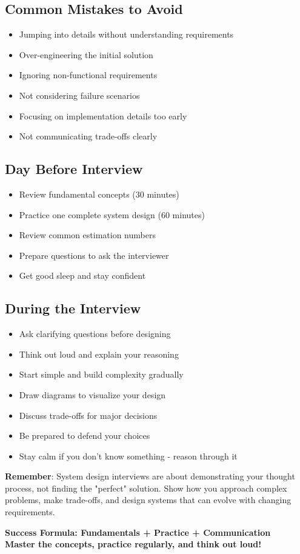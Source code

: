 \documentclass[10pt,a4paper]{article}
\begin{document}
\subsection{Common Mistakes to Avoid}
\begin{itemize}
\item Jumping into details without understanding requirements
\item Over-engineering the initial solution
\item Ignoring non-functional requirements
\item Not considering failure scenarios
\item Focusing on implementation details too early
\item Not communicating trade-offs clearly
\end{itemize}

\subsection{Day Before Interview}
\begin{itemize}
\item Review fundamental concepts (30 minutes)
\item Practice one complete system design (60 minutes)
\item Review common estimation numbers
\item Prepare questions to ask the interviewer
\item Get good sleep and stay confident
\end{itemize}

\subsection{During the Interview}
\begin{itemize}
\item Ask clarifying questions before designing
\item Think out loud and explain your reasoning
\item Start simple and build complexity gradually
\item Draw diagrams to visualize your design
\item Discuss trade-offs for major decisions
\item Be prepared to defend your choices
\item Stay calm if you don't know something - reason through it
\end{itemize}

\begin{tradeoffbox}
\textbf{Remember}: System design interviews are about demonstrating your thought process, not finding the "perfect" solution. Show how you approach complex problems, make trade-offs, and design systems that can evolve with changing requirements.
\end{tradeoffbox}

\vspace{1cm}
\begin{center}
\textbf{\Large Success Formula: Fundamentals + Practice + Communication}\\
\textbf{\Large Master the concepts, practice regularly, and think out loud!}
\end{center}
\end{document}
